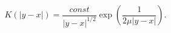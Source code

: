 \begin{equation}
K(|y-x|)=\frac{const}{|y-x|^{1/2}} \exp\left( \frac{1}{2\mu|y-x|}\right).
\label{K}
\end{equation}

